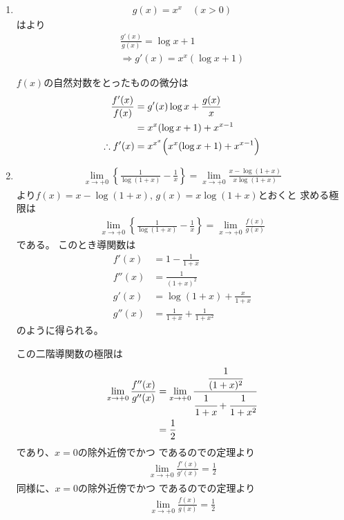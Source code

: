 \begin{ans*}
  ${}$
  \begin{enumerate}[label=(\arabic*)]
    \item
    \begin{gather}
      g(x) = x^{x} \quad (x > 0)
    \end{gather}
    はより
    \begin{gather}
      \frac{g'(x)}{g(x)} = \log x + 1 \\
      \Rightarrow g'(x) = x^{x}(\log x + 1)
    \end{gather}

    $f(x)$の自然対数をとったものの微分は
    \begin{align}
      \frac{f'(x)}{f(x)}
      &= g'(x)\log x + \frac{g(x)}{x} \\
      &= x^{x}(\log x + 1) + x^{x-1} \\
      \therefore f'(x)
      &= x^{x^{x}}\Bigl(x^{x}(\log x + 1) + x^{x-1}\Bigr)
    \end{align}

    \item
    \begin{align}
      \lim_{x\to +0}\left\{ \frac{1}{\log(1+x)} - \frac{1}{x} \right\}
      = \lim_{x\to +0}\frac{x-\log(1+x)}{x\log(1+x)}
    \end{align}
    より$f(x) = x-\log(1+x),\,g(x) = x\log(1+x)$とおくと
    求める極限は
    \begin{gather}
      \lim_{x\to +0}\left\{ \frac{1}{\log(1+x)} - \frac{1}{x} \right\}
      = \lim_{x\to +0}\frac{f(x)}{g(x)}
    \end{gather}
    である。
    このとき導関数は
    \begin{align}
      f'(x) &= 1 - \frac{1}{1+x} \\
      f''(x)&= \frac{1}{(1+x)^2} \\
      g'(x) &= \log(1+x) + \frac{x}{1+x} \\
      g''(x)&= \frac{1}{1+x} + \frac{1}{1+x^2}
    \end{align}
    のように得られる。

    この二階導関数の極限は
    \begin{align}
      \lim_{x\to +0}\frac{f''(x)}{g''(x)}
      &= \lim_{x\to +0}\frac{\cfrac{1}{(1+x)^2}}{\cfrac{1}{1+x} + \cfrac{1}{1+x^2}} \\
      &= \frac{1}{2}
    \end{align}
    であり、$x=0$の除外近傍でかつ
    であるので\lhopital の定理より
    \begin{gather}
      \lim_{x\to +0}\frac{f'(x)}{g'(x)}
      =\frac{1}{2}
    \end{gather}
    同様に、$x=0$の除外近傍でかつ
    であるので\lhopital の定理より
    \begin{gather}
      \lim_{x\to +0}\frac{f(x)}{g(x)} = \frac{1}{2}
    \end{gather}
\end{enumerate}
\end{ans*}

